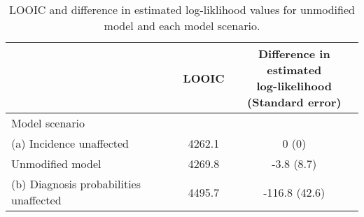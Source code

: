 \begin{table}[!h]
\centering\centering
\caption{\label{tab:hiv_looic}LOOIC and difference in estimated log-liklihood values for unmodified model and each model scenario.}
\centering
\begin{tabular}[t]{lcc}
\toprule
 & LOOIC & \makecell[c]{Difference in estimated\\log-likelihood\\(Standard error)}\\
\midrule
Model scenario &  & \\
\hspace{1em}(a) Incidence unaffected & 4262.1 & 0 (0) \\
\hspace{1em}Unmodified model & 4269.8 & -3.8 (8.7) \\
\hspace{1em}(b) Diagnosis probabilities unaffected & 4495.7 & -116.8 (42.6) \\
\bottomrule
\end{tabular}
\end{table}

